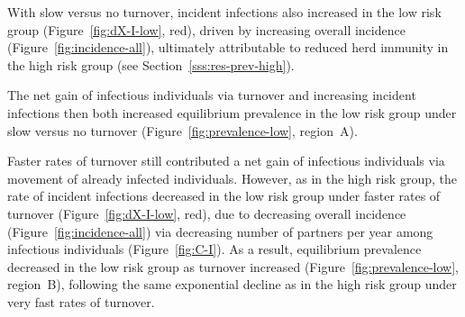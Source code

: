 
With slow versus no turnover,
incident infections also increased in the low risk group
(Figure~\ref{fig:dX-I-low}, red),
driven by increasing overall incidence
(Figure~\ref{fig:incidence-all}),
ultimately attributable to reduced herd immunity in the high risk group
(see Section~\ref{sss:res-prev-high}).

The net gain of infectious individuals via turnover and increasing incident infections
then both increased equilibrium prevalence in the low risk group
under slow versus no turnover
(Figure~\ref{fig:prevalence-low}, region~A).
\par
Faster rates of turnover still contributed a net gain of infectious individuals
via movement of already infected individuals.
However, as in the high risk group,
the rate of incident infections decreased
in the low risk group under faster rates of turnover
(Figure~\ref{fig:dX-I-low}, red),
due to decreasing overall incidence
(Figure~\ref{fig:incidence-all})
via decreasing number of partners per year among infectious individuals
(Figure~\ref{fig:C-I}).
As a result, equilibrium prevalence decreased in the low risk group as turnover increased
(Figure~\ref{fig:prevalence-low}, region~B),
following the same exponential decline as in the high risk group
under very fast rates of turnover.
